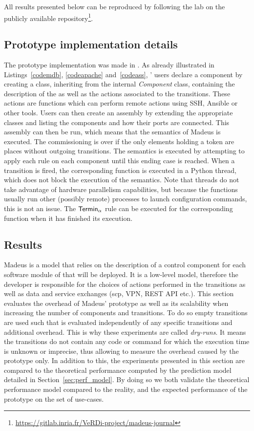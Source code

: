 All results presented below can be reproduced by following the lab on
the publicly available repository\footnote{\url{https://gitlab.inria.fr/VeRDi-project/madeus-journal}}.


\subsection{Prototype implementation details}
The prototype implementation was made in \python. As already illustrated in Listings~\ref{codemdb}, \ref{codeapache} and~\ref{codeass}, \mad' users declare a component by creating a class, inheriting from the internal \emph{Component} class, containing the description of the \net as well as the actions associated to the transitions. These actions are \python functions which can perform remote actions using SSH, Ansible or other tools. Users can then create an assembly by extending the appropriate classes and listing the components and how their ports are connected. This assembly can then be run, which means that the semantics of Madeus is executed. The commissioning is over if the only elements holding a token are places without outgoing transitions. The semantics is executed by attempting to apply each rule on each component until this ending case is reached. When a transition is fired, the corresponding \python function is executed in a Python thread, which does not block the execution of the semantics. Note that \python threads do not take advantage of hardware parallelism capabilities, but because the functions usually run other (possibly remote) processes to launch configuration commands, this is not an issue. The $\mathsf{Termin}_\alpha$ rule can be executed for the corresponding function when it has finished its execution.

\subsection{Results}

Madeus is a model that relies on the description of a control component for each software module of that will be deployed. It is a low-level model, therefore the developer is responsible for the choices of actions performed in the transitions as well as data and service exchanges (\eg scp, VPN, REST API etc.).  This section evaluates the overhead of Madeus' prototype as well as its scalability when increasing the number of components and transitions. To do so empty transitions are used such that \mad is evaluated independently of any specific transitions and additional overhead. This is why these experiments are called \emph{dry-runs}. It means the transitions do not contain any code or command for which the execution time is unknown or imprecise, thus allowing to measure the overhead caused by the prototype only. In addition to this, the experiments presented in this section are compared to the theoretical performance computed by the prediction model detailed in Section~\ref{sec:perf_model}. By doing so we both validate the theoretical performance model compared to the reality, and the expected performance of the prototype on the set of use-cases.

